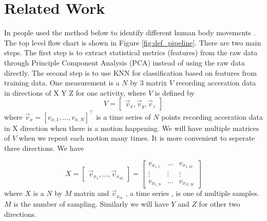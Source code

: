 \documentclass[acmtog]{acmart}
\begin{document}
\section{Related Work}
In \cite{matlab1} people used the method below to identify different human body movements \cite{human_data}. The top level flow chart is shown in  Figure \ref{fig:def_pipeline}.  There are two main steps.  The first step is to extract statistical metrics (features) from the raw data through Principle Component Analysis (PCA) \cite{pca} instead of using the raw data directly. The second step is to use KNN for classification based on features from training data.  One  measurement is a $N$ by $3$ matrix $V$  recording acceration data in directions of X Y Z for one activity, where $V$ is defined by 
\begin{equation}
V =
\begin{bmatrix}
\vec{v}_x , \vec{v}_y , \vec{v}_z
\end{bmatrix}
\label{eq:one_measure}
\end{equation}
where $\vec{v}_x=[v_{x,1},\dots,v_{x,N}]^\top$ is a time series of $N$ points recording acceration data in X direction when there is a motion happening. 
We will have multiple matrices of $V$ when we repeat each motion many times. It is more convenient to seperate three directions. We have

\begin{equation}
X =
\begin{bmatrix}
\vec{v}_{x_1} ,\dots,\vec{v}_{x_M}
\end{bmatrix}
=
\begin{bmatrix}
v_{x_{1,1}} & \dots & v_{x_{1,M}} \\
 \vdots  &\vdots & \vdots \\
v_{x_{1,N}} & \dots & v_{x_{N,M}}
\end{bmatrix}
\label{eq:multi_measure}
\end{equation}
where $X$ is a $N$ by $M$ matrix and $\vec{v}_{x_m}$ , a time series , is one of multiple samples. $M$ is the number of sampling. Similarly we will have $Y$ and $Z$ for other two directions. 
\end{document}
